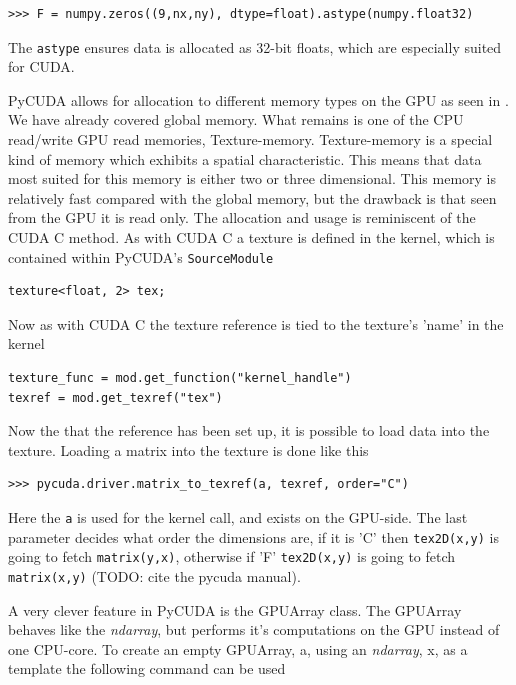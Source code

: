 \begin{verbatim}
>>> F = numpy.zeros((9,nx,ny), dtype=float).astype(numpy.float32)
\end{verbatim}

The \texttt{astype} ensures data is allocated as 32-bit floats, which are especially suited for CUDA.

PyCUDA allows for allocation to different memory types on the GPU as seen in . We have already covered global memory. What remains is one of the CPU read/write GPU read memories, Texture-memory. Texture-memory is a special kind of memory which exhibits a spatial characteristic. This means that data most suited for this memory is either two or three dimensional. This memory is relatively fast compared with the global memory, but the drawback is that seen from the GPU it is read only. The allocation and usage is reminiscent of the CUDA C method. As with CUDA C a texture is defined in the kernel, which is contained within PyCUDA's \texttt{SourceModule}

\begin{verbatim}
texture<float, 2> tex;
\end{verbatim}

Now as with CUDA C the texture reference is tied to the texture's 'name' in the kernel

\begin{verbatim}
texture_func = mod.get_function("kernel_handle")
texref = mod.get_texref("tex")
\end{verbatim}

Now the that the reference has been set up, it is possible to load data into the texture. Loading a matrix into the texture is done like this

\begin{verbatim}
>>> pycuda.driver.matrix_to_texref(a, texref, order="C")
\end{verbatim}

Here the \texttt{a} is used for the kernel call, and exists on the GPU-side. The last parameter decides what order the dimensions are, if it is 'C' then \texttt{tex2D(x,y)} is going to fetch \texttt{matrix(y,x)}, otherwise if 'F' \texttt{tex2D(x,y)} is going to fetch \texttt{matrix(x,y)} (TODO: cite the pycuda manual).

A very clever feature in PyCUDA is the GPUArray class. The GPUArray behaves like the \textit{ndarray}, but performs it's computations on the GPU instead of one CPU-core. To create an empty GPUArray, a, using an \textit{ndarray}, x, as a template the following command can be used

